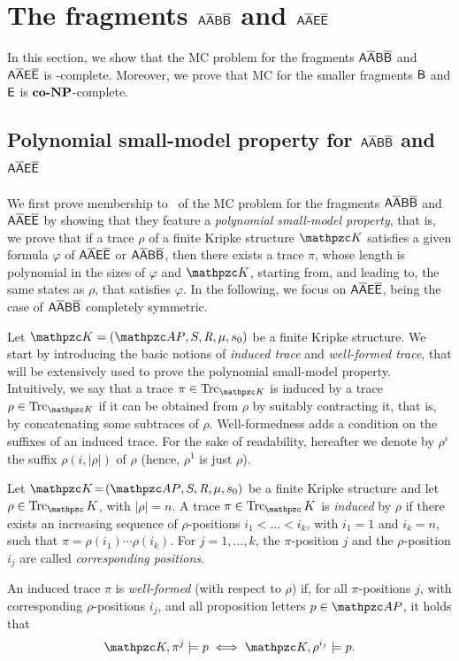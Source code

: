 \section{The fragments $\mathsf{A\overline{A}B\overline{B}}$ and $\mathsf{A\overline{A}E\overline{E}}$}\label{sec:AAbarEEbar}
In this section, we show that the MC problem for the fragments $\mathsf{A\overline{A}B\overline{B}}$ and $\mathsf{A\overline{A}E\overline{E}}$  is \PSPACE-complete.
Moreover, we prove that MC for the smaller fragments $\mathsf{B}$ and $\mathsf{E}$ is $\textbf{co-}\textbf{NP}$-complete.

\subsection{Polynomial small-model property for $\mathsf{A\overline{A}B\overline{B}}$ and $\mathsf{A\overline{A}E\overline{E}}$}\label{subsec:polyAAbarEEbar}
We first prove membership to \PSPACE\ of the MC problem for the fragments $\mathsf{A\overline{A}B\overline{B}}$ and $\mathsf{A\overline{A}E\overline{E}}$ by showing that they feature a \emph{polynomial small-model property}, that is, we prove that if a trace $\rho$ of a finite Kripke structure $\Ku$ satisfies a given formula $\varphi$ of $\mathsf{A\overline{A}E\overline{E}}$ or $\mathsf{A\overline{A}B\overline{B}}$, then there exists a trace $\pi$, whose length is polynomial in the sizes of $\varphi$ and $\Ku$, starting from, and leading to, the same states as $\rho$, that satisfies $\varphi$. In the following, we focus on $\mathsf{A\overline{A}E\overline{E}}$, being the case of $\mathsf{A\overline{A}B\overline{B}}$ completely symmetric.

Let $\Ku= \KuDef$ be a finite Kripke structure.
We start by introducing the basic notions of \emph{induced trace} and \emph{well-formed trace}, that will be extensively used to prove the polynomial small-model property. 
%
Intuitively, we say that a trace $\pi\in\Trk_{\Ku}$ is induced by a trace $\rho\in\Trk_{\Ku}$ if it can be obtained from 
$\rho$ by suitably contracting it, that is, by concatenating some subtraces of $\rho$.
Well-formedness adds a condition on the suffixes of an induced trace.
For the sake of readability, hereafter we denote by $\rho^i$ the suffix $\rho(i,|\rho|)$ of $\rho$ (hence, $\rho^1$ is just $\rho$).

\begin{definition} \label{definition:inducedTrk}
Let $\Ku\!=\! \KuDef$ be a finite Kripke structure and let $\rho\in\Trk_\Ku$, with $|\rho| = n$. 
A trace $\pi\in\Trk_\Ku$ is \emph{induced} by $\rho$ if there exists an increasing sequence of 
$\rho$-positions $i_1<\ldots < i_k$, with $i_1=1$ and $i_k=n$, such that $\pi= \rho(i_1)\cdots \rho(i_k)$.
For $j = 1, \ldots, k$, the $\pi$-position $j$ and the $\rho$-position $i_j$ are called \emph{corresponding positions}.

An induced trace $\pi$ is \emph{well-formed} (with respect to $\rho$) if, for all $\pi$-positions $j$, with corresponding $\rho$-positions $i_j$, and all proposition letters $p\in \Prop$, it holds that
\[\Ku,\pi^{j} \models p \iff \Ku,\rho^{i_j} \models p.\]
\end{definition}

